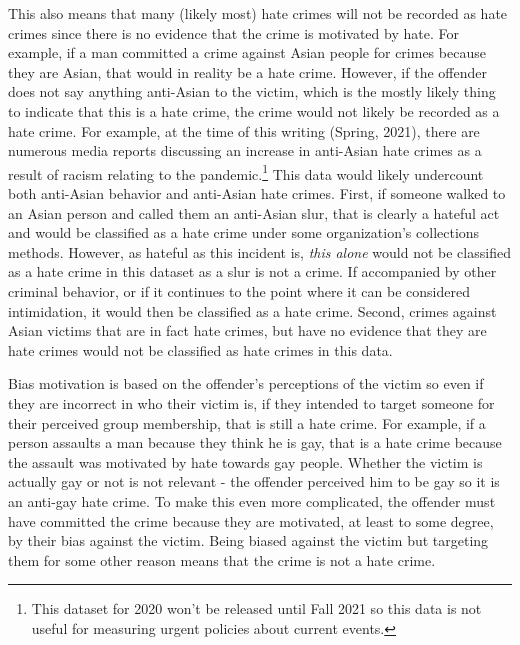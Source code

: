 \documentclass[
  12pt,
  openany]{book}
\begin{document}
This also means that many (likely most) hate crimes will not be recorded as hate crimes since there is no evidence that the crime is motivated by hate. For example, if a man committed a crime against Asian people for crimes because they are Asian, that would in reality be a hate crime. However, if the offender does not say anything anti-Asian to the victim, which is the mostly likely thing to indicate that this is a hate crime, the crime would not likely be recorded as a hate crime. For example, at the time of this writing (Spring, 2021), there are numerous media reports discussing an increase in anti-Asian hate crimes as a result of racism relating to the pandemic.\footnote{This dataset for 2020 won't be released until Fall 2021 so this data is not useful for measuring urgent policies about current events.} This data would likely undercount both anti-Asian behavior and anti-Asian hate crimes. First, if someone walked to an Asian person and called them an anti-Asian slur, that is clearly a hateful act and would be classified as a hate crime under some organization's collections methods. However, as hateful as this incident is, \emph{this alone} would not be classified as a hate crime in this dataset as a slur is not a crime. If accompanied by other criminal behavior, or if it continues to the point where it can be considered intimidation, it would then be classified as a hate crime. Second, crimes against Asian victims that are in fact hate crimes, but have no evidence that they are hate crimes would not be classified as hate crimes in this data.

Bias motivation is based on the offender's perceptions of the victim so even if they are incorrect in who their victim is, if they intended to target someone for their perceived group membership, that is still a hate crime. For example, if a person assaults a man because they think he is gay, that is a hate crime because the assault was motivated by hate towards gay people. Whether the victim is actually gay or not is not relevant - the offender perceived him to be gay so it is an anti-gay hate crime. To make this even more complicated, the offender must have committed the crime because they are motivated, at least to some degree, by their bias against the victim. Being biased against the victim but targeting them for some other reason means that the crime is not a hate crime.
\end{document}
